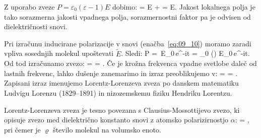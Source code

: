 Z uporabo zveze
$P = \varepsilon_0 (\varepsilon -1) E$ dobimo:
\beq
{} = E +  = 
E.
\label{eq:09_32}
\eeq
Jakost lokalnega polja je tako sorazmerna jakosti vpadnega polja, sorazmernostni
faktor pa je odvisen od dielektričnosti snovi.

Pri izračunu inducirane polarizacije v snovi (enačba~\ref{eq:09_10}) 
moramo zaradi vpliva sosednjih molekul upoštevati $\tilde{E}$. Sledi:
\beq
P = 
\,E_0\,e^{-i\omega t}
= \varepsilon_0 () E_0\,e^{-i\omega t}.
\label{eq:09_33}
\eeq
Od tod izračunamo zvezo:
\beq
{} =  = 
.
\label{eq:09_34}
\eeq
Če je krožna frekvenca vpadne svetlobe daleč od lastnih frekvenc, lahko dušenje zanemarimo in 
izraz preoblikujemo v:
\beq
{} =  = 
.
\label{eq:09_35}
\eeq
Zapisani izraz imenujemo Lorentz-Lorenzeva zveza po danskem matematiku Ludvigu Lorenzu 
(1829--1891) in nizozemskemu fiziku Hendriku Lorentzu. 

\begin{remark}
 Lorentz-Lorenzeva zveza je tesno povezana s Clausius-Mossottijevo zvezo, ki opisuje
 zvezo med dielektrično konstanto snovi z atomsko polarizirnostjo $\alpha$:
 \beq
{} = ,
\label{eq:09_35a}
\eeq
pri čemer je $\varrho$ število molekul na volumsko enoto. 
\end{remark}

